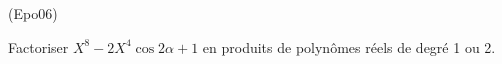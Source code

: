 \begin{tiny}(Epo06)\end{tiny} Factoriser $X^{8}-2X^{4}\cos 2\alpha +1$ en produits de polyn{\^o}mes r{\'e}els de degr{\'e} 1 ou 2.